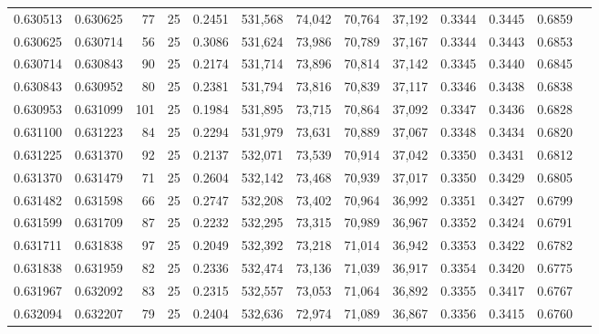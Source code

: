 \begin{tabular}{rrrrrrrrrrrrr}
0.630513 & 0.630625 &    77 &  25 &                                     0.2451 & 531,568 &  74,042 &  70,764 &  37,192 & 0.3344 & 0.3445 & 0.6859 \\
0.630625 & 0.630714 &    56 &  25 &                                     0.3086 & 531,624 &  73,986 &  70,789 &  37,167 & 0.3344 & 0.3443 & 0.6853 \\
0.630714 & 0.630843 &    90 &  25 &                                     0.2174 & 531,714 &  73,896 &  70,814 &  37,142 & 0.3345 & 0.3440 & 0.6845 \\
0.630843 & 0.630952 &    80 &  25 &                                     0.2381 & 531,794 &  73,816 &  70,839 &  37,117 & 0.3346 & 0.3438 & 0.6838 \\
0.630953 & 0.631099 &   101 &  25 &                                     0.1984 & 531,895 &  73,715 &  70,864 &  37,092 & 0.3347 & 0.3436 & 0.6828 \\
0.631100 & 0.631223 &    84 &  25 &                                     0.2294 & 531,979 &  73,631 &  70,889 &  37,067 & 0.3348 & 0.3434 & 0.6820 \\
0.631225 & 0.631370 &    92 &  25 &                                     0.2137 & 532,071 &  73,539 &  70,914 &  37,042 & 0.3350 & 0.3431 & 0.6812 \\
0.631370 & 0.631479 &    71 &  25 &                                     0.2604 & 532,142 &  73,468 &  70,939 &  37,017 & 0.3350 & 0.3429 & 0.6805 \\
0.631482 & 0.631598 &    66 &  25 &                                     0.2747 & 532,208 &  73,402 &  70,964 &  36,992 & 0.3351 & 0.3427 & 0.6799 \\
0.631599 & 0.631709 &    87 &  25 &                                     0.2232 & 532,295 &  73,315 &  70,989 &  36,967 & 0.3352 & 0.3424 & 0.6791 \\
0.631711 & 0.631838 &    97 &  25 &                                     0.2049 & 532,392 &  73,218 &  71,014 &  36,942 & 0.3353 & 0.3422 & 0.6782 \\
0.631838 & 0.631959 &    82 &  25 &                                     0.2336 & 532,474 &  73,136 &  71,039 &  36,917 & 0.3354 & 0.3420 & 0.6775 \\
0.631967 & 0.632092 &    83 &  25 &                                     0.2315 & 532,557 &  73,053 &  71,064 &  36,892 & 0.3355 & 0.3417 & 0.6767 \\
0.632094 & 0.632207 &    79 &  25 &                                     0.2404 & 532,636 &  72,974 &  71,089 &  36,867 & 0.3356 & 0.3415 & 0.6760 \\

\end{tabular}
